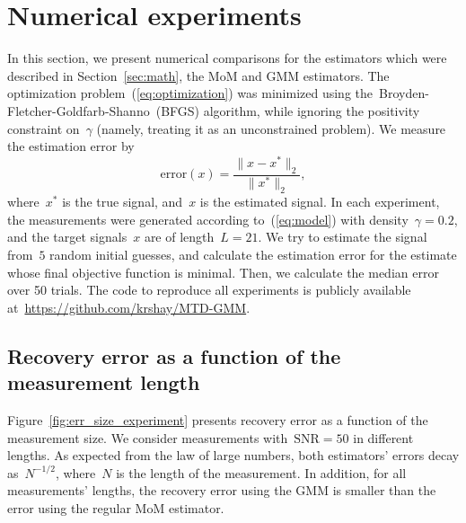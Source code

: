 \documentclass{article}
\begin{document}
\section{Numerical experiments}
\label{sec:numerical}
In this section, we present numerical comparisons for the estimators which were described in Section~\ref{sec:math}, the MoM and GMM estimators. The optimization problem~(\ref{eq:optimization}) was minimized using the~\mbox{Broyden-Fletcher-Goldfarb-Shanno}~(BFGS) algorithm, while ignoring the positivity constraint on~$\gamma$ (namely, treating it as an unconstrained problem).  We measure the estimation error by
\begin{equation*}
\text{error}(x) = \frac{\|x - x^*\|_2}{\|x^*\|_2},
\end{equation*}
where~$x^*$ is the true signal, and~$x$ is the estimated signal. In each experiment, the measurements were generated according to~(\ref{eq:model}) with density~\mbox{$\gamma = 0.2$}, and the target signals~$x$ are of length~\mbox{$L = 21$}. We try to estimate the signal from~$5$ random initial guesses, and calculate the estimation error for the estimate whose final objective function is minimal. Then, we  calculate the median  error over 50 trials. The code to reproduce all experiments is publicly available at~\url{https://github.com/krshay/MTD-GMM}.


\subsection{Recovery error as a function of the measurement length}
\label{subsec:exp_size}
Figure~\ref{fig:err_size_experiment} presents recovery error as a function of the measurement size. We consider measurements with~\mbox{$\text{SNR} = 50$} in different lengths. As expected from the law of large numbers, both estimators' errors  decay as~$N^{-1/2}$, where~$N$ is the length of the measurement. In addition, for all measurements' lengths, the recovery error using the GMM is smaller than the error using the regular MoM estimator.
\end{document}
